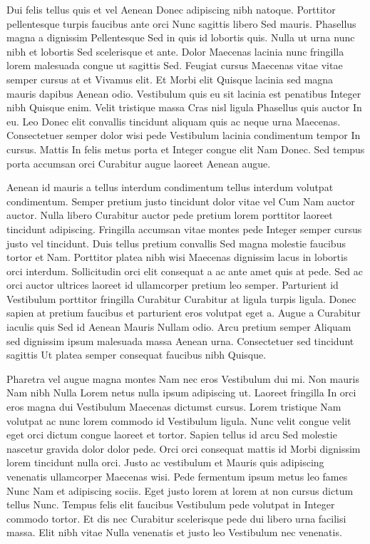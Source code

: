 Dui felis tellus quis et vel Aenean Donec adipiscing nibh natoque. Porttitor pellentesque turpis faucibus ante orci Nunc sagittis libero Sed mauris. Phasellus magna a dignissim Pellentesque Sed in quis id lobortis quis. Nulla ut urna nunc nibh et lobortis Sed scelerisque et ante. Dolor Maecenas lacinia nunc fringilla lorem malesuada congue ut sagittis Sed. Feugiat cursus Maecenas vitae vitae semper cursus at et Vivamus elit. Et Morbi elit Quisque lacinia sed magna mauris dapibus Aenean odio. Vestibulum quis eu sit lacinia est penatibus Integer nibh Quisque enim. Velit tristique massa Cras nisl ligula Phasellus quis auctor In eu. Leo Donec elit convallis tincidunt aliquam quis ac neque urna Maecenas. Consectetuer semper dolor wisi pede Vestibulum lacinia condimentum tempor In cursus. Mattis In felis metus porta et Integer congue elit Nam Donec. Sed tempus porta accumsan orci Curabitur augue laoreet Aenean augue.

Aenean id mauris a tellus interdum condimentum tellus interdum volutpat condimentum. Semper pretium justo tincidunt dolor vitae vel Cum Nam auctor auctor. Nulla libero Curabitur auctor pede pretium lorem porttitor laoreet tincidunt adipiscing. Fringilla accumsan vitae montes pede Integer semper cursus justo vel tincidunt. Duis tellus pretium convallis Sed magna molestie faucibus tortor et Nam. Porttitor platea nibh wisi Maecenas dignissim lacus in lobortis orci interdum. Sollicitudin orci elit consequat a ac ante amet quis at pede. Sed ac orci auctor ultrices laoreet id ullamcorper pretium leo semper. Parturient id Vestibulum porttitor fringilla Curabitur Curabitur at ligula turpis ligula. Donec sapien at pretium faucibus et parturient eros volutpat eget a. Augue a Curabitur iaculis quis Sed id Aenean Mauris Nullam odio. Arcu pretium semper Aliquam sed dignissim ipsum malesuada massa Aenean urna. Consectetuer sed tincidunt sagittis Ut platea semper consequat faucibus nibh Quisque. 

Pharetra vel augue magna montes Nam nec eros Vestibulum dui mi. Non mauris Nam nibh Nulla Lorem netus nulla ipsum adipiscing ut. Laoreet fringilla In orci eros magna dui Vestibulum Maecenas dictumst cursus. Lorem tristique Nam volutpat ac nunc lorem commodo id Vestibulum ligula. Nunc velit congue velit eget orci dictum congue laoreet et tortor. Sapien tellus id arcu Sed molestie nascetur gravida dolor dolor pede. Orci orci consequat mattis id Morbi dignissim lorem tincidunt nulla orci. Justo ac vestibulum et Mauris quis adipiscing venenatis ullamcorper Maecenas wisi. Pede fermentum ipsum metus leo fames Nunc Nam et adipiscing sociis. Eget justo lorem at lorem at non cursus dictum tellus Nunc. Tempus felis elit faucibus Vestibulum pede volutpat in Integer commodo tortor. Et dis nec Curabitur scelerisque pede dui libero urna facilisi massa. Elit nibh vitae Nulla venenatis et justo leo Vestibulum nec venenatis. 

